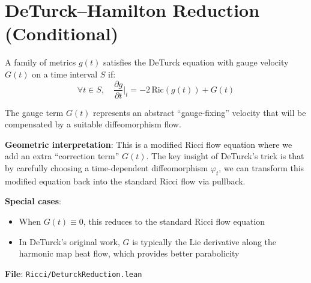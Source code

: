 \section{DeTurck--Hamilton Reduction (Conditional)}

\begin{definition}
\label{def:deturckEqOnWithGauge}
A family of metrics $g(t)$ satisfies the DeTurck equation with gauge velocity $G(t)$ on a time interval $S$ if:
\[ \forall t \in S, \quad \frac{\partial g}{\partial t}\Big|_t = -2 \, \mathrm{Ric}(g(t)) + G(t) \]

The gauge term $G(t)$ represents an abstract ``gauge-fixing'' velocity that will be compensated by a suitable diffeomorphism flow.

\textbf{Geometric interpretation}: This is a modified Ricci flow equation where we add an extra ``correction term'' $G(t)$. The key insight of DeTurck's trick is that by carefully choosing a time-dependent diffeomorphism $\varphi_t$, we can transform this modified equation back into the standard Ricci flow via pullback.

\textbf{Special cases}:
\begin{itemize}
\item When $G(t) \equiv 0$, this reduces to the standard Ricci flow equation
\item In DeTurck's original work, $G$ is typically the Lie derivative along the harmonic map heat flow, which provides better parabolicity
\end{itemize}

\textbf{File}: \texttt{Ricci/DeturckReduction.lean}
\end{definition}

